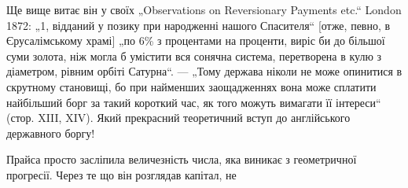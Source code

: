 Ще вище витає він у своїх „Observations on Reversionary Payments
etc.“ London 1872: „1, відданий у позику при народженні
нашого Спасителя“ [отже, певно, в Єрусалімському храмі]
„по 6\% з процентами на проценти, виріс би до більшої суми
золота, ніж могла б умістити вся сонячна система, перетворена
в кулю з діаметром, рівним орбіті Сатурна“. — „Тому держава
ніколи не може опинитися в скрутному становищі, бо при найменших
заощадженнях вона може сплатити найбільший борг за
такий короткий час, як того можуть вимагати її інтереси“ (стор.
XIII, XIV). Який прекрасний теоретичний вступ до англійського
державного боргу!

Прайса просто засліпила величезність числа, яка виникає з геометричної
прогресії. Через те що він розглядав капітал, не
\parbreak{}  %
